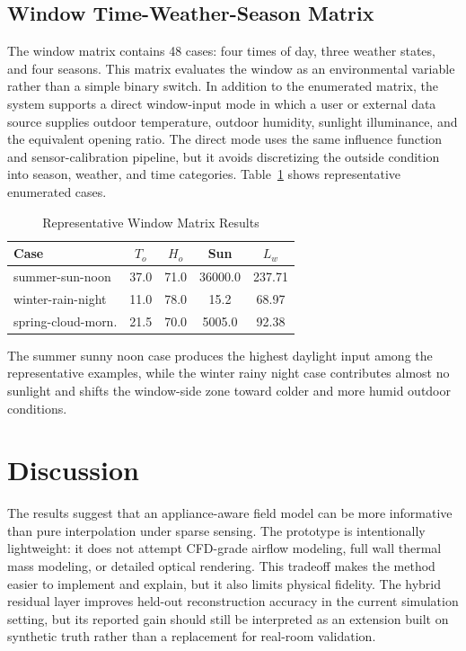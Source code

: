 \documentclass[conference]{IEEEtran}
\begin{document}
\subsection{Window Time-Weather-Season Matrix}
The window matrix contains 48 cases: four times of day, three weather states, and four seasons. This matrix evaluates the window as an environmental variable rather than a simple binary switch. In addition to the enumerated matrix, the system supports a direct window-input mode in which a user or external data source supplies outdoor temperature, outdoor humidity, sunlight illuminance, and the equivalent opening ratio. The direct mode uses the same influence function and sensor-calibration pipeline, but it avoids discretizing the outside condition into season, weather, and time categories. Table~\ref{tab:window} shows representative enumerated cases.

\begin{table}[t]
\caption{Representative Window Matrix Results}
\label{tab:window}
\centering
\scriptsize
\begin{tabular}{|l|c|c|c|c|}
\hline
Case & $T_o$ & $H_o$ & Sun & $L_w$\\
\hline
summer-sun-noon & 37.0 & 71.0 & 36000.0 & 237.71\\
winter-rain-night & 11.0 & 78.0 & 15.2 & 68.97\\
spring-cloud-morn. & 21.5 & 70.0 & 5005.0 & 92.38\\
\hline
\end{tabular}
\end{table}

The summer sunny noon case produces the highest daylight input among the representative examples, while the winter rainy night case contributes almost no sunlight and shifts the window-side zone toward colder and more humid outdoor conditions.

\section{Discussion}
The results suggest that an appliance-aware field model can be more informative than pure interpolation under sparse sensing. The prototype is intentionally lightweight: it does not attempt CFD-grade airflow modeling, full wall thermal mass modeling, or detailed optical rendering. This tradeoff makes the method easier to implement and explain, but it also limits physical fidelity. The hybrid residual layer improves held-out reconstruction accuracy in the current simulation setting, but its reported gain should still be interpreted as an extension built on synthetic truth rather than a replacement for real-room validation.
\end{document}
